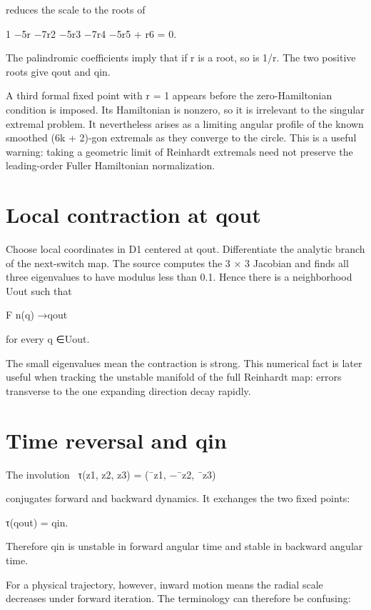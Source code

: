 reduces the scale to the roots of


1 −5r −7r2 −5r3 −7r4 −5r5 + r6 = 0.


The palindromic coefficients imply that if r is a root, so is 1/r. The two positive roots give qout and qin.


A third formal fixed point with r = 1 appears before the zero-Hamiltonian condition is imposed. Its Hamiltonian is nonzero, so it is irrelevant to the singular extremal problem. It nevertheless arises as a limiting angular profile of the known smoothed (6k + 2)-gon extremals as they converge to the circle. This is a useful warning: taking a geometric limit of Reinhardt extremals need not preserve the leading-order Fuller Hamiltonian normalization.


\section{Local contraction at qout}

Choose local coordinates in D1 centered at qout. Differentiate the analytic branch of the next-switch map. The source computes the 3 × 3 Jacobian and finds all three eigenvalues to have modulus less than 0.1. Hence there is a neighborhood Uout such that


F n(q) →qout


for every q ∈Uout.


The small eigenvalues mean the contraction is strong. This numerical fact is later useful when tracking the unstable manifold of the full Reinhardt map: errors transverse to the one expanding direction decay rapidly.


\section{Time reversal and qin}

\begin{displaytext}
The involution \
τ(z1, z2, z3) = (¯z1, −¯z2, ¯z3)
\end{displaytext}

conjugates forward and backward dynamics. It exchanges the two fixed points:


\begin{displaytext}
τ(qout) = qin.
\end{displaytext}

Therefore qin is unstable in forward angular time and stable in backward angular time.


For a physical trajectory, however, inward motion means the radial scale decreases under forward iteration. The terminology can therefore be confusing:


